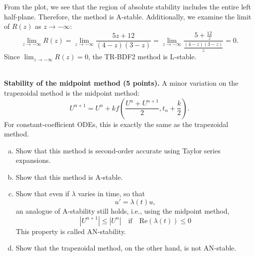 \documentclass{article}
\begin{document}
\begin{enumerate}[(a)]
\begin{figure}[H]
    \end{figure}
    \noindent From the plot, we see that the region of absolute stability includes the entire left half-plane. Therefore, the method is A-stable. Additionally, we examine the limit of $R(z)$ as $z \to -\infty$:
    \[
        \lim_{z \to -\infty} R(z) = \lim_{z \to -\infty} \frac{5z + 12}{(4-z)(3 - z)} = \lim_{z \to -\infty} \frac{5 + \frac{12}{z}}{\frac{(4-z)(3 - z)}{z}} = 0.
    \]
    Since $\lim_{z \to -\infty} R(z) = 0$, the TR-BDF2 method is L-stable.

  \end{enumerate}





\begin{problem} \\ 
    \textbf{Stability of the midpoint method (5 points).} A minor variation on the trapezoidal method is the midpoint method: 
    \[
        U^{n+1} = U^n + k f\left( \frac{U^n + U^{n+1}}{2}, t_n + \frac{k}{2} \right).
    \]
    For constant-coefficient ODEs, this is exactly the same as the trapezoidal method.
    \begin{enumerate}[(a)]
        \item Show that this method is second-order accurate using Taylor series expansions.
        \item Show that this method is A-stable.
        \item Show that even if $\lambda$ varies in time, so that 
        \[
            u' = \lambda(t) u,
        \]
        an analogue of A-stability still holds, i.e., using the midpoint method,
        \[
            |U^{n+1}| \leq |U^n| \quad \text{if} \quad \text{Re}(\lambda(t)) \leq 0 %
        \]
        This property is called AN-stability.
        \item Show that the trapezoidal method, on the other hand, is not AN-stable.
    \end{enumerate}
\end{problem}
\end{document}
